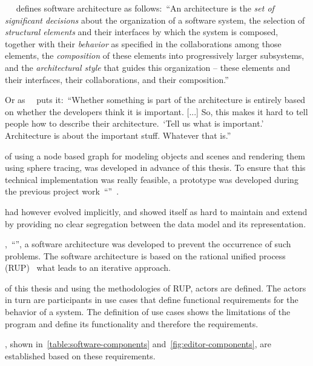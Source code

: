 \documentclass[%
    a4paper,    %
    justified,  %
    nobib,      %
    openany     %
]{tufte-book}
\begin{document}
~~\cite{kruchten_rup_2003} defines
software architecture as follows:~\enquote{An architecture is the \textit{set of
significant decisions} about the organization of a software system, the
selection of \textit{structural elements} and their interfaces by which the
system is composed, together with their \textit{behavior} as specified in the
collaborations among those elements, the \textit{composition} of these elements
into progressively larger subsystems, and the \textit{architectural style} that
guides this organization -- these elements and their interfaces, their
collaborations, and their composition.}

Or as~~\cite{folwer_architect_2003} puts
it:~\enquote{Whether something is part of the architecture is entirely based on
whether the developers think it is important. [...] So, this makes it hard to
tell people how to describe their architecture.~\enquote{Tell us what is
important.} Architecture is about the important stuff. Whatever that
is.}

 of using a node based graph for
modeling objects and scenes and rendering them using sphere tracing, was
developed in advance of this thesis. To ensure that this technical
implementation was really feasible, a prototype was developed during the
previous project
work~\enquote{}~\cite{osterwalder-volume-2016}.

 had however evolved implicitly,
and showed itself as hard to maintain and extend by providing no clear
segregation between the data model and its representation.

,~\enquote{}, a software architecture was
developed to prevent the occurrence of such problems. The software architecture
is based on the rational unified process (RUP)~\cite{kruchten_rup_2003} what
leads to an iterative approach.

 of this thesis and using the methodologies of
RUP, actors are defined. The actors in turn are participants in use cases that
define functional requirements for the behavior of a system. The definition of
use cases shows the limitations of the program and define its functionality and
therefore the requirements.

, shown in~\autoref{table:software-components}
and~\autoref{fig:editor-components}, are established based on these
requirements.
\end{document}
